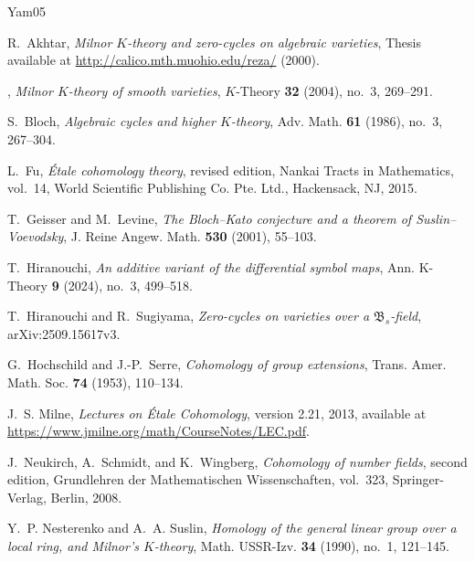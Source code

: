 \begin{thebibliography}{Yam05}

R.~Akhtar, \emph{Milnor {$K$}-theory and zero-cycles on algebraic varieties},
Thesis available at \url{http://calico.mth.muohio.edu/reza/} (2000).

\bysame, \emph{Milnor {$K$}-theory of smooth varieties}, $K$-Theory
\textbf{32} (2004), no.~3, 269--291.

S.~Bloch, \emph{Algebraic cycles and higher {$K$}-theory}, Adv. Math.
\textbf{61} (1986), no.~3, 267--304.

L.~Fu, \emph{\'Etale cohomology theory}, revised edition,
Nankai Tracts in Mathematics, vol.~14, World Scientific Publishing Co.
Pte. Ltd., Hackensack, NJ, 2015.

T.~Geisser and M.~Levine,
\emph{The Bloch--Kato conjecture and a theorem of Suslin--Voevodsky},
J. Reine Angew. Math. \textbf{530} (2001), 55--103.

T.~Hiranouchi, \emph{An additive variant of the differential symbol maps}, Ann. K-Theory \textbf{9} (2024), no.~3, 499--518.

T.~Hiranouchi and R.~Sugiyama, \emph{Zero-cycles on varieties over a $\mathfrak{B}_s$-field}, arXiv:2509.15617v3. 


G.~Hochschild and J.-P.~Serre, \emph{Cohomology of group extensions},
Trans. Amer. Math. Soc. \textbf{74} (1953), 110--134.




J.~S. Milne, \emph{Lectures on \'Etale Cohomology}, version 2.21,
2013, available at \url{https://www.jmilne.org/math/CourseNotes/LEC.pdf}.

J.~Neukirch, A.~Schmidt, and K.~Wingberg,
\emph{Cohomology of number fields}, second edition,
Grundlehren der Mathematischen Wissenschaften, vol.~323,
Springer-Verlag, Berlin, 2008.

Y.~P. Nesterenko and A.~A. Suslin, \emph{Homology of the general linear group
over a local ring, and {M}ilnor's {$K$}-theory}, Math. USSR-Izv. \textbf{34}
(1990), no.~1, 121--145.


\end{thebibliography}
